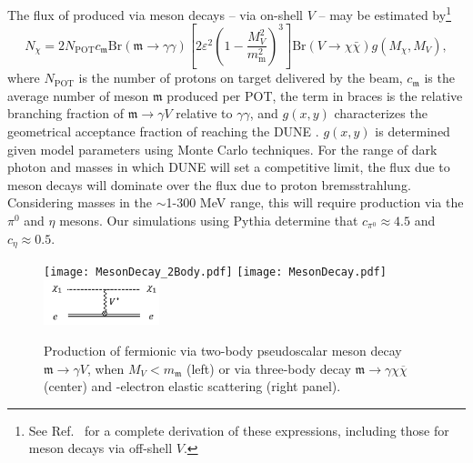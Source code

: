 The flux of  produced via meson decays -- via on-shell $V$ -- may be estimated by\footnote{See Ref.~\cite{DeRomeri:2019kic} for a complete derivation of these expressions, including those for meson decays via off-shell $V$.}
\begin{equation}
    N_\chi = 2 N_\mathrm{POT} c_\mathfrak{m} \mathrm{Br}(\mathfrak{m}\to \gamma\gamma) \left[ 2 \varepsilon^2 \left(1 - \frac{M_{V}^2}{m_\mathrm{m}^2}\right)^3\right] \mathrm{Br}(V \to \chi\bar{\chi}) g(M_\chi, M_{V}),
\end{equation}
where $N_\mathrm{POT}$ is the number of protons on target delivered by the beam, $c_\mathfrak{m}$ is the average number of meson $\mathfrak{m}$ produced per POT, the term in braces is the relative branching fraction of $\mathfrak{m} \to \gamma V$ relative to $\gamma\gamma$, and $g(x, y)$ characterizes the geometrical acceptance fraction of  reaching the DUNE . $g(x, y)$ is determined given model parameters using Monte Carlo techniques. For the range of dark photon and  masses in which DUNE will set a competitive limit, the  flux due to meson decays will dominate over the flux due to proton bremsstrahlung. Considering  masses in the $\sim$1-300 MeV range, this will require production via the $\pi^0$ and $\eta$ mesons. Our simulations using {\sc Pythia} determine that $c_{\pi^0} \approx 4.5$ and $c_\eta \approx 0.5$.

\begin{figure}[t]
\centering
 \texttt{[image: MesonDecay\_2Body.pdf]}
    \texttt{[image: MesonDecay.pdf]}
\includegraphics[width=0.30\textwidth]{graphics/DM_detect.png}
\caption[DM production via meson decays and DM-e$^-$ elastic scattering]{ 
Production of fermionic  via two-body pseudoscalar meson decay $\mathfrak{m} \to \gamma V$, when $M_{V} < m_\mathfrak{m}$ (left) or via three-body decay $\mathfrak{m} \to \gamma \chi \overline{\chi}$ (center) and -electron elastic scattering (right panel).}
\label{fig:dm_prod}
\end{figure}

